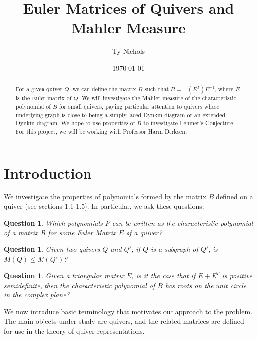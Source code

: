 \documentclass{amsart}
\theoremstyle{theorem}
\theoremstyle{theorem*}
\newtheorem{question}[theorem]{Question}
\theoremstyle{definition}
\begin{document}
\date{\today}
\title[Euler Matrices and Mahler Measure] {Euler Matrices of Quivers and Mahler Measure}
\author[T. Nichols]{Ty Nichols}
\address{Department of Mathematics, Northeastern University, Boston,
    Massachusetts~02115}
\begin{abstract} For a given quiver $Q$, we can define the matrix $B$ such that
    $B = -(E^T)E^{-1}$, where $E$ is the Euler matrix of $Q$. We will
    investigate the Mahler measure of the characteristic polynomial of $B$ for
    small quivers, paying particular attention to quivers whose underlying graph
    is close to being a simply laced Dynkin diagram or an extended Dynkin
    diagram. We hope to use properties of $B$ to investigate Lehmer's
    Conjecture. For this project, we will be working with Professor Harm
    Derksen.
\end{abstract}
\maketitle

\section{Introduction}

We investigate the properties of polynomials formed by the matrix $B$ defined
on a quiver (see sections 1.1-1.5). In particular, we ask these questions:

\begin{question}
    Which polynomials $P$ can be written as the characteristic polynomial of a 
    matrix $B$ for some Euler Matrix $E$ of a quiver?
\end{question}

\begin{question}
    Given two quivers $Q$ and $Q'$, if $Q$ is a subgraph of $Q'$, is $M(Q) \leq
        M(Q')$?
\end{question}

\begin{question}
    Given a triangular matrix $E$, is it the case that if $E + E^T$ is positive semidefinite,
    then the characteristic polynomial of $B$ has roots on the unit circle in the complex plane?
\end{question}

We now introduce basic terminology that motivates our approach to the
problem. The main objects under study are quivers, and the related matrices are
defined for use in the theory of quiver representations.
\end{document}
